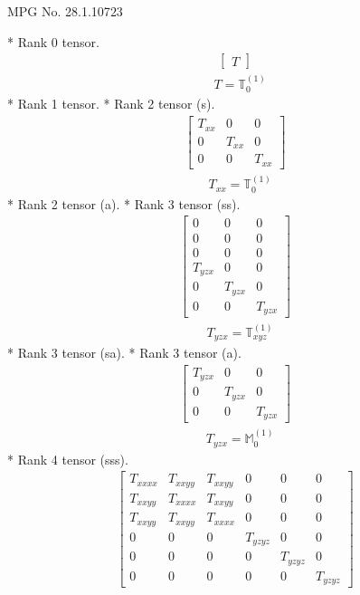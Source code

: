 \documentclass[fleqn,8pt,landscape]{jsarticle}
\begin{document}
\setcounter{MaxMatrixCols}{32}

\renewcommand{\tablename}{Table~}
\renewcommand{\figurename}{Figure~}
\begin{center}
\LARGE
MPG No. 28.1.107\quad$23$
\end{center}
* Rank 0 tensor.
\begin{align*}
\begin{bmatrix} T \end{bmatrix}
\end{align*}
\begin{align*}
& T = \mathbb{T}_{0}^{(1)}
\end{align*}
* Rank 1 tensor.
* Rank 2 tensor (s).
\begin{align*}
\begin{bmatrix} T_{xx} & 0 & 0 \\ 0 & T_{xx} & 0 \\ 0 & 0 & T_{xx} \end{bmatrix}
\end{align*}
\begin{align*}
& T_{xx} = \mathbb{T}_{0}^{(1)}
\end{align*}
* Rank 2 tensor (a).
* Rank 3 tensor (ss).
\begin{align*}
\begin{bmatrix} 0 & 0 & 0 \\ 0 & 0 & 0 \\ 0 & 0 & 0 \\ T_{yzx} & 0 & 0 \\ 0 & T_{yzx} & 0 \\ 0 & 0 & T_{yzx} \end{bmatrix}
\end{align*}
\begin{align*}
& T_{yzx} = \mathbb{T}_{xyz}^{(1)}
\end{align*}
* Rank 3 tensor (sa).
* Rank 3 tensor (a).
\begin{align*}
\begin{bmatrix} T_{yzx} & 0 & 0 \\ 0 & T_{yzx} & 0 \\ 0 & 0 & T_{yzx} \end{bmatrix}
\end{align*}
\begin{align*}
& T_{yzx} = \mathbb{M}_{0}^{(1)}
\end{align*}
* Rank 4 tensor (sss).
\begin{align*}
\begin{bmatrix} T_{xxxx} & T_{xxyy} & T_{xxyy} & 0 & 0 & 0 \\ T_{xxyy} & T_{xxxx} & T_{xxyy} & 0 & 0 & 0 \\ T_{xxyy} & T_{xxyy} & T_{xxxx} & 0 & 0 & 0 \\ 0 & 0 & 0 & T_{yzyz} & 0 & 0 \\ 0 & 0 & 0 & 0 & T_{yzyz} & 0 \\ 0 & 0 & 0 & 0 & 0 & T_{yzyz} \end{bmatrix}
\end{align*}
\end{document}
